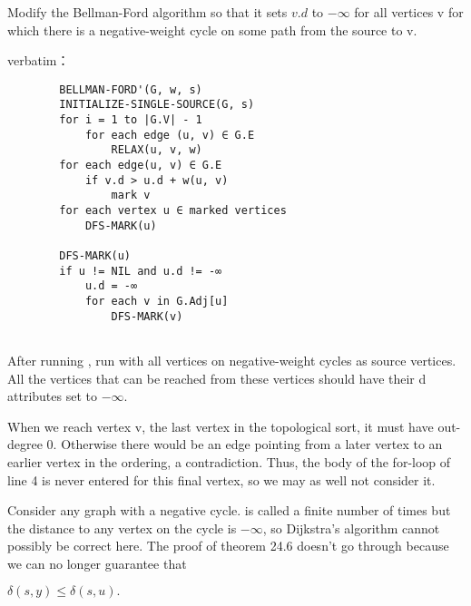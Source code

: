 \documentclass[a4paper, justified]{tufte-handout}
\begin{document}
\begin{problem}[TC 24.1-4]
Modify the Bellman-Ford algorithm so that it sets $v.d$ to $-\infty$ for all vertices v for which there is a negative-weight cycle on some path from the source to v.
\end{problem}

\begin{solution}
	\noindent verbatim：
	\begin{verbatim}
		BELLMAN-FORD'(G, w, s)
		INITIALIZE-SINGLE-SOURCE(G, s)
		for i = 1 to |G.V| - 1
			for each edge (u, v) ∈ G.E
				RELAX(u, v, w)
		for each edge(u, v) ∈ G.E
			if v.d > u.d + w(u, v)
				mark v
		for each vertex u ∈ marked vertices
			DFS-MARK(u)

		DFS-MARK(u)
		if u != NIL and u.d != -∞
			u.d = -∞
			for each v in G.Adj[u]
				DFS-MARK(v)
			
	\end{verbatim}
	After running , run  with all vertices on negative-weight cycles as source vertices. All the vertices that can be reached from these vertices should have their d attributes set to $-\infty$.
\end{solution}

\begin{problem}[TC 24.2-2]

\end{problem}

\begin{solution}
	When we reach vertex v, the last vertex in the topological sort, it must have out\text-degree 0. Otherwise there would be an edge pointing from a later vertex to an earlier vertex in the ordering, a contradiction. Thus, the body of the for-loop of line 4 is never entered for this final vertex, so we may as well not consider it.
\end{solution}

\begin{problem}[TC 24.3-2]
\end{problem}

\begin{solution}
	Consider any graph with a negative cycle.  is called a finite number of times but the distance to any vertex on the cycle is $-\infty$, so Dijkstra's algorithm cannot possibly be correct here. The proof of theorem 24.6 doesn't go through because we can no longer guarantee that

	$\delta(s, y) \le \delta(s, u).$
\end{solution}
\end{document}
